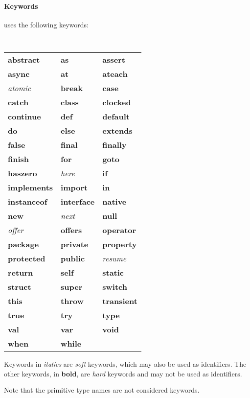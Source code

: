 \paragraph{Keywords}
\Xten{} uses the following keywords:\\
{\tt 
\begin{tabular}{lll}
    {\bf abstract} &
    {\bf as}&
    {\bf assert}\\
    {\bf async}&
    {\bf at}&
    {\bf ateach}\\
    {\it atomic}&
    {\bf break}&
    {\bf case}\\
    {\bf catch}&
    {\bf class}&
    {\bf clocked}\\
    {\bf continue}&
    {\bf def}&
    {\bf default}\\
    {\bf do}&
    {\bf else}&
    {\bf extends}\\
    {\bf false}&
    {\bf final}&
    {\bf finally}\\
    {\bf finish}&
    {\bf for}&
    {\bf goto}\\
    {\bf haszero}&
    {\it here}&
    {\bf if}\\
    {\bf implements}&
    {\bf import}&
    {\bf in}\\
    {\bf instanceof}&
    {\bf interface}&
    {\bf native}\\
    {\bf new}&
    {\it next}&
    {\bf null}\\
    {\it offer}&
    {\bf offers}&
    {\bf operator}\\
    {\bf package}&
    {\bf private}&
    {\bf property}\\
    {\bf protected}&
    {\bf public}&
    {\it resume}\\
    {\bf return}&
    {\bf self}&
    {\bf static}\\
    {\bf struct}&
    {\bf super}&
    {\bf switch}\\
    {\bf this}&
    {\bf throw}&
    {\bf transient}\\
    {\bf true}&
    {\bf try}&
    {\bf type}\\
    {\bf val}&
    {\bf var}&
    {\bf void}\\
    {\bf when}& 
    {\bf while}&
\end{tabular}
}

Keywords in {\em italics} are {\em soft} keywords, which may also be
used as identifiers.  The other keywords, in {\bf bold}, are {\em hard}
keywords and  may not be used as identifiers.

Note that the primitive type names are not considered keywords.

